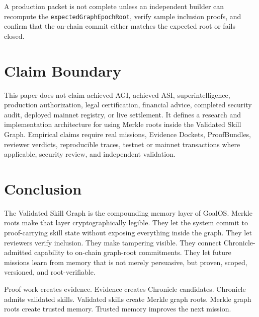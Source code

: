 \documentclass[11pt,letterpaper]{article}
\begin{document}
\begin{greenbox}
A production packet is not complete unless an independent builder can recompute the \texttt{expectedGraphEpochRoot}, verify sample inclusion proofs, and confirm that the on-chain commit either matches the expected root or fails closed.
\end{greenbox}

\section{Claim Boundary}
This paper does not claim achieved AGI, achieved ASI, superintelligence, production authorization, legal certification, financial advice, completed security audit, deployed mainnet registry, or live settlement. It defines a research and implementation architecture for using Merkle roots inside the Validated Skill Graph. Empirical claims require real missions, Evidence Dockets, ProofBundles, reviewer verdicts, reproducible traces, testnet or mainnet transactions where applicable, security review, and independent validation.

\section{Conclusion}
The Validated Skill Graph is the compounding memory layer of GoalOS. Merkle roots make that layer cryptographically legible. They let the system commit to proof-carrying skill state without exposing everything inside the graph. They let reviewers verify inclusion. They make tampering visible. They connect Chronicle-admitted capability to on-chain graph-root commitments. They let future missions learn from memory that is not merely persuasive, but proven, scoped, versioned, and root-verifiable.

\begin{thesisbox}
Proof work creates evidence. Evidence creates Chronicle candidates. Chronicle admits validated skills. Validated skills create Merkle graph roots. Merkle graph roots create trusted memory. Trusted memory improves the next mission.
\end{thesisbox}
\end{document}
